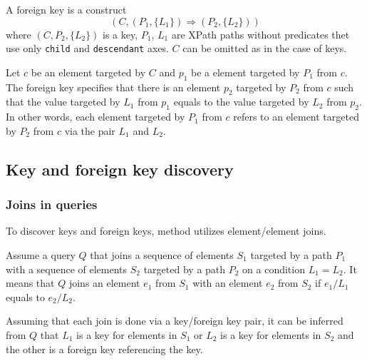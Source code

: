 \begin{define}
A foreign key is a construct $$(C, (P_1, \{L_1\}) \Rightarrow (P_2, \{L_2\}))$$ where $(C, P_2, \{L_2\})$ is a key, $P_1$, $L_1$ are XPath paths without predicates thet use only \texttt{child} and \texttt{descendant} axes.
$C$ can be omitted as in the case of keys.
\end{define}

Let $c$ be an element targeted by $C$ and $p_1$ be a element targeted by $P_1$ from $c$. The foreign key specifies that there is an element $p_2$ targeted by $P_2$ from $c$ such that the value targeted by $L_1$ from $p_1$ equals to the value targeted by $L_2$ from $p_2$. In other words, each element targeted by $P_1$ from $c$ refers to an element targeted by $P_2$ from $c$ via the pair $L_1$ and $L_2$.

\subsection{Key and foreign key discovery}
\subsubsection{Joins in queries}
To discover keys and foreign keys, method utilizes element/element joins.

Assume a query $Q$ that joins a sequence of elements $S_1$ targeted by a path $P_1$ with a sequence of elements $S_2$ targeted by a path $P_2$ on a condition $L_1 = L_2$. It means that $Q$ joins an element $e_1$ from $S_1$ with an element $e_2$ from $S_2$ if $e_1/L_1$ equals to $e_2/L_2$.


Assuming that each join is done via a key/foreign key pair, it can be inferred from $Q$ that $L_1$ is a key for elements in $S_1$ or $L_2$ is a key for elements in $S_2$ and the other is a foreign key referencing the key.

